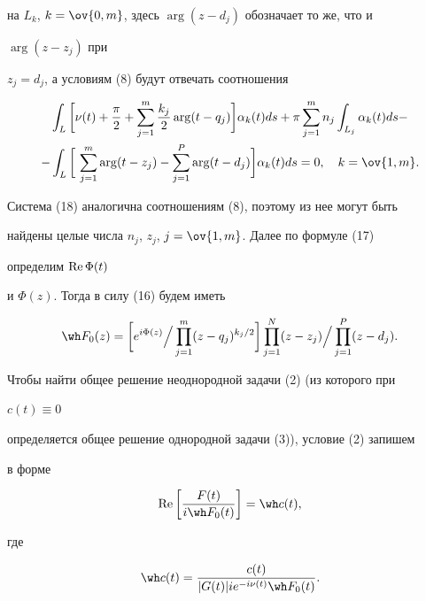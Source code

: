 на $L_k$, $k=\ov{0,m}$, здесь $\arg(z-d_j)$ обозначает то же, что и 


$\arg(z-z_j)$ при 


$z_j=d_j$, а условиям (8) будут отвечать соотношения 


\begin{multline} 


\int_L\bigg[\nu(t)+\frac{\pi}{2}+\sum^m_{j=1}\frac{k_j}{2} 


\arg(t-q_j)\bigg]\alpha_k(t)ds+\pi\sum^m_{j=1}n_j 


\int_{L_j}\alpha_k(t)ds- \\ 


% 


-\int_L\bigg[\,\sum^m_{j=1}\arg(t-z_j)- 


\sum^P_{j=1}\arg(t-d_j)\bigg]\alpha_k(t)ds=0, 


\quad k=\ov{1,m}. 


\end{multline} 


Система (18) аналогична соотношениям (8), поэтому из нее могут быть 


найдены целые числа $n_j$, $z_j$, $j=\ov{1,m}$. Далее по формуле (17) 


определим $\operatorname{Re}\Phi(t)$ 


и $\Phi(z)$. Тогда в силу (16) будем иметь 


\begin{equation} 


\wh F_0(z)=\bigg[e^{i\Phi(z)}\Big/\prod^m_{j=1} 


(z-q_j)^{k_j/2}\bigg]\prod^N_{j=1}(z-z_j)\Big/ 


\prod^P_{j=1}(z-d_j). 


\end{equation} 


Чтобы найти общее решение неоднородной задачи (2) (из которого при 


$c(t)\equiv0$ 


определяется общее решение однородной задачи (3)), условие (2) запишем 


в форме 


\begin{equation} 


\re\bigg[\frac{F(t)}{i\wh F_0(t)}\bigg]=\wh c(t), 


\end{equation} 


где 


\begin{equation} 


\wh c(t)=\frac{c(t)}{|G(t)|i e^{-i\nu(t)}\wh F_0(t)}. 


\end{equation} 


